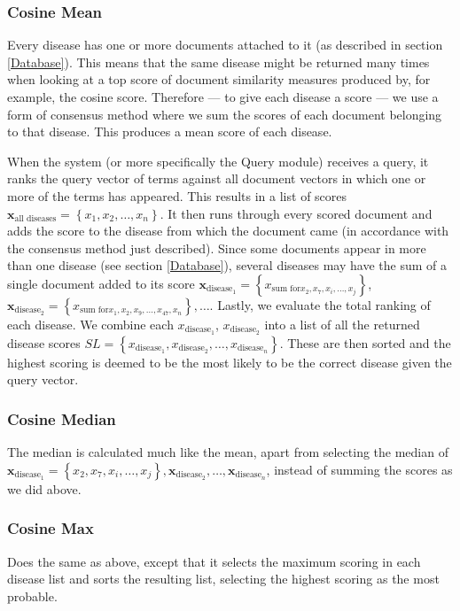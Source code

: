 \subsubsection{Cosine Mean}
Every disease has one or more documents attached to it (as described
in section \ref{Database}). This means that the same disease might be
returned many times when looking at a top score of document similarity
measures produced by, for example, the cosine score. Therefore --- to
give each disease a score --- we use a form of consensus method where
we sum the scores of each document belonging to that disease. This
produces a mean score of each disease.

When the system (or more specifically the Query module) receives a
query, it ranks the query vector of terms against all document vectors
in which one or more of the terms has appeared. This results in a list
of scores $\mathbf{x}_{\textrm{all diseases}} = \left\{x_1, x_2,
\dots, x_n \right\}$. It then runs through every scored document and
adds the score to the disease from which the document came (in
accordance with the consensus method just described). Since some
documents appear in more than one disease (see section
\ref{Database}), several diseases may have the sum of a single
document added to its score $\mathbf{x}_{\textrm{disease}_{1}} =
\left\{x_{\textrm{sum for} x_2, x_7, x_i, \dots, x_j}\right\}$,
$\mathbf{x}_{\textrm{disease}_{2}} = \left\{x_{\textrm{sum for} x_1,
  x_2, x_9, \dots, x_47, x_n}\right\}, \dots$. Lastly, we evaluate the
total ranking of each disease. We combine each
$x_{\textrm{disease}_1}$, $x_{\textrm{disease}_2}$ into a list of all
the returned disease scores $\mathbf{\mathit{SL}} =
\left\{x_{\textrm{disease}_1},x_{\textrm{disease}_2}, \dots,
x_{\textrm{disease}_n}\right\}$. These are then sorted and the highest
scoring is deemed to be the most likely to be the correct disease given the
query vector.

\subsubsection{Cosine Median}
The median is calculated much like the mean, apart from selecting the
median of $\mathbf{x}_{\textrm{disease}_{1}} = \left\{x_2,x_7, x_i,
\dots, x_j\right\}, \mathbf{x}_{\textrm{disease}_{2}}, \dots,
\mathbf{x}_{\textrm{disease}_{n}}$, instead of summing the scores as
we did above.

\subsubsection{Cosine Max}
Does the same as above, except that it selects the maximum scoring in each
disease list and sorts the resulting list, selecting the highest
scoring as the most probable.


